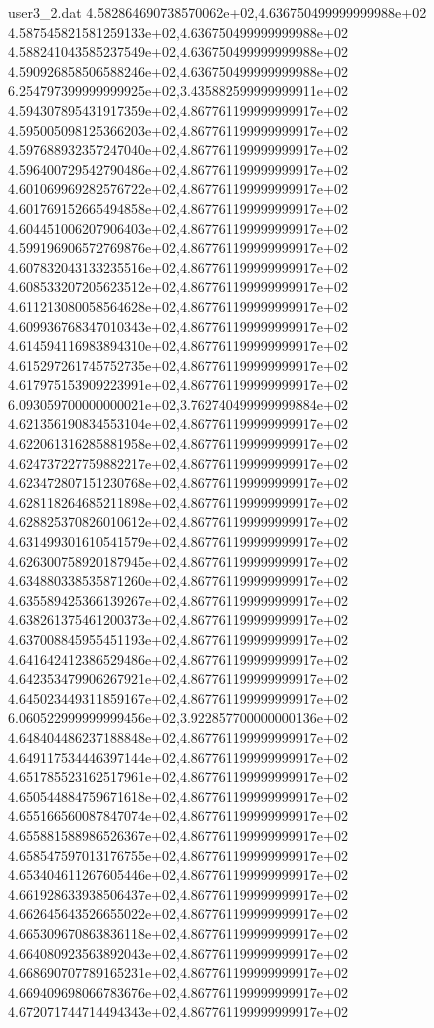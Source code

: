 \begin{filecontents}{user3_2.dat}
4.582864690738570062e+02,4.636750499999999988e+02
4.587545821581259133e+02,4.636750499999999988e+02
4.588241043585237549e+02,4.636750499999999988e+02
4.590926858506588246e+02,4.636750499999999988e+02
6.254797399999999925e+02,3.435882599999999911e+02
4.594307895431917359e+02,4.867761199999999917e+02
4.595005098125366203e+02,4.867761199999999917e+02
4.597688932357247040e+02,4.867761199999999917e+02
4.596400729542790486e+02,4.867761199999999917e+02
4.601069969282576722e+02,4.867761199999999917e+02
4.601769152665494858e+02,4.867761199999999917e+02
4.604451006207906403e+02,4.867761199999999917e+02
4.599196906572769876e+02,4.867761199999999917e+02
4.607832043133235516e+02,4.867761199999999917e+02
4.608533207205623512e+02,4.867761199999999917e+02
4.611213080058564628e+02,4.867761199999999917e+02
4.609936768347010343e+02,4.867761199999999917e+02
4.614594116983894310e+02,4.867761199999999917e+02
4.615297261745752735e+02,4.867761199999999917e+02
4.617975153909223991e+02,4.867761199999999917e+02
6.093059700000000021e+02,3.762740499999999884e+02
4.621356190834553104e+02,4.867761199999999917e+02
4.622061316285881958e+02,4.867761199999999917e+02
4.624737227759882217e+02,4.867761199999999917e+02
4.623472807151230768e+02,4.867761199999999917e+02
4.628118264685211898e+02,4.867761199999999917e+02
4.628825370826010612e+02,4.867761199999999917e+02
4.631499301610541579e+02,4.867761199999999917e+02
4.626300758920187945e+02,4.867761199999999917e+02
4.634880338535871260e+02,4.867761199999999917e+02
4.635589425366139267e+02,4.867761199999999917e+02
4.638261375461200373e+02,4.867761199999999917e+02
4.637008845955451193e+02,4.867761199999999917e+02
4.641642412386529486e+02,4.867761199999999917e+02
4.642353479906267921e+02,4.867761199999999917e+02
4.645023449311859167e+02,4.867761199999999917e+02
6.060522999999999456e+02,3.922857700000000136e+02
4.648404486237188848e+02,4.867761199999999917e+02
4.649117534446397144e+02,4.867761199999999917e+02
4.651785523162517961e+02,4.867761199999999917e+02
4.650544884759671618e+02,4.867761199999999917e+02
4.655166560087847074e+02,4.867761199999999917e+02
4.655881588986526367e+02,4.867761199999999917e+02
4.658547597013176755e+02,4.867761199999999917e+02
4.653404611267605446e+02,4.867761199999999917e+02
4.661928633938506437e+02,4.867761199999999917e+02
4.662645643526655022e+02,4.867761199999999917e+02
4.665309670863836118e+02,4.867761199999999917e+02
4.664080923563892043e+02,4.867761199999999917e+02
4.668690707789165231e+02,4.867761199999999917e+02
4.669409698066783676e+02,4.867761199999999917e+02
4.672071744714494343e+02,4.867761199999999917e+02

\end{filecontents}
